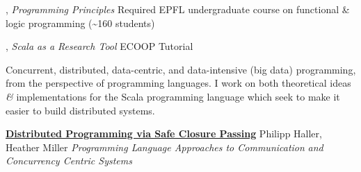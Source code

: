 \documentclass[9pt]{article}
\begin{document}
, {\em Programming Principles} 
\newline\noindent Required EPFL undergraduate course on functional \& logic programming
\newline\noindent (\textasciitilde160 students)
\medskip

, {\em Scala as a Research Tool} 
\newline\noindent ECOOP Tutorial
\pagebreak



\textheight=580pt

\noindent Concurrent, distributed, data-centric, and data-intensive (big data) programming, from the perspective of programming languages. I work on both theoretical ideas {\em \&} implementations for the Scala programming language which seek to make it easier to build distributed systems.
\bigskip






\noindent\href{https://infoscience.epfl.ch/record/205039}{\bf Distributed Programming via Safe Closure Passing}
\newline\noindent Philipp Haller, Heather Miller
\newline\noindent\emph{Programming Language Approaches to Communication}
\newline\noindent\emph{and Concurrency Centric Systems}
\bigskip
\end{document}
